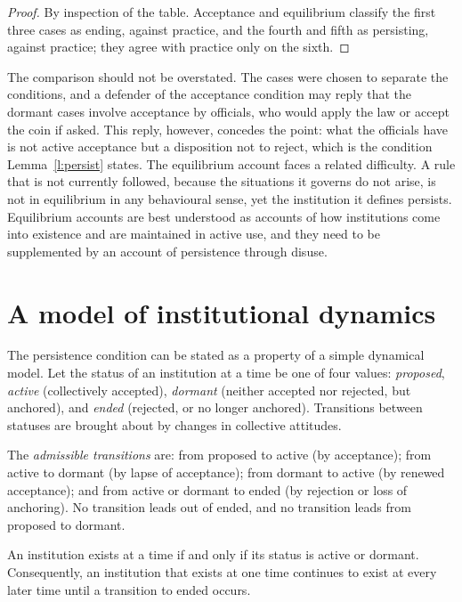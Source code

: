 \documentclass{situationist-preprint}
\begin{document}
\begin{proof}
By inspection of the table. Acceptance and equilibrium classify the first three cases as ending, against practice, and the fourth and fifth as persisting, against practice; they agree with practice only on the sixth.
\end{proof}

The comparison should not be overstated. The cases were chosen to separate the conditions, and a defender of the acceptance condition may reply that the dormant cases involve acceptance by officials, who would apply the law or accept the coin if asked. This reply, however, concedes the point: what the officials have is not active acceptance but a disposition not to reject, which is the condition Lemma~\ref{l:persist} states. The equilibrium account faces a related difficulty. A rule that is not currently followed, because the situations it governs do not arise, is not in equilibrium in any behavioural sense, yet the institution it defines persists. Equilibrium accounts are best understood as accounts of how institutions come into existence and are maintained in active use, and they need to be supplemented by an account of persistence through disuse.

\section{A model of institutional dynamics}

The persistence condition can be stated as a property of a simple dynamical model. Let the status of an institution at a time be one of four values: \emph{proposed}, \emph{active} (collectively accepted), \emph{dormant} (neither accepted nor rejected, but anchored), and \emph{ended} (rejected, or no longer anchored). Transitions between statuses are brought about by changes in collective attitudes.

\begin{definition}\label{d:transitions}
The \emph{admissible transitions} are: from proposed to active (by acceptance); from active to dormant (by lapse of acceptance); from dormant to active (by renewed acceptance); and from active or dormant to ended (by rejection or loss of anchoring). No transition leads out of ended, and no transition leads from proposed to dormant.
\end{definition}

\begin{proposition}\label{p:dynamics}
An institution exists at a time if and only if its status is active or dormant. Consequently, an institution that exists at one time continues to exist at every later time until a transition to ended occurs.
\end{proposition}
\end{document}
